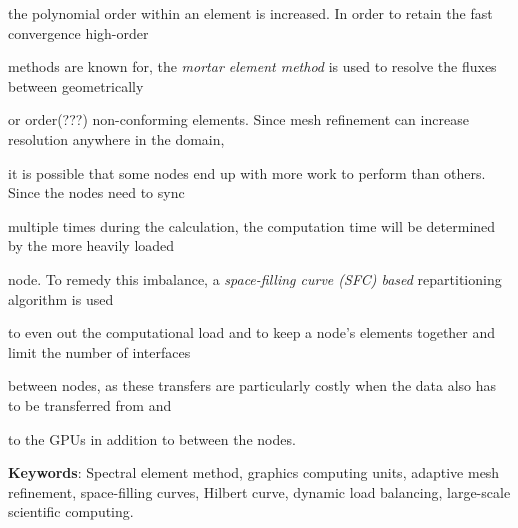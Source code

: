 the polynomial order within an element is increased. In order to retain the fast convergence high-order 

methods are known for, the \textit{mortar element method} is used to resolve the fluxes between geometrically

or order(???) non-conforming elements. Since mesh refinement can increase resolution anywhere in the domain, 

it is possible that some nodes end up with more work to perform than others. Since the nodes need to sync 

multiple times during the calculation, the computation time will be determined by the more heavily loaded

node. To remedy this imbalance, a \textit{space-filling curve (SFC) based} repartitioning algorithm is used

to even out the computational load and to keep a node's elements together and limit the number of interfaces

between nodes, as these transfers are particularly costly when the data also has to be transferred from and 

to the GPUs in addition to between the nodes.



\textbf{Keywords}: Spectral element method, graphics computing units, adaptive mesh refinement, space-filling curves, Hilbert curve, dynamic load balancing, large-scale scientific computing.

 